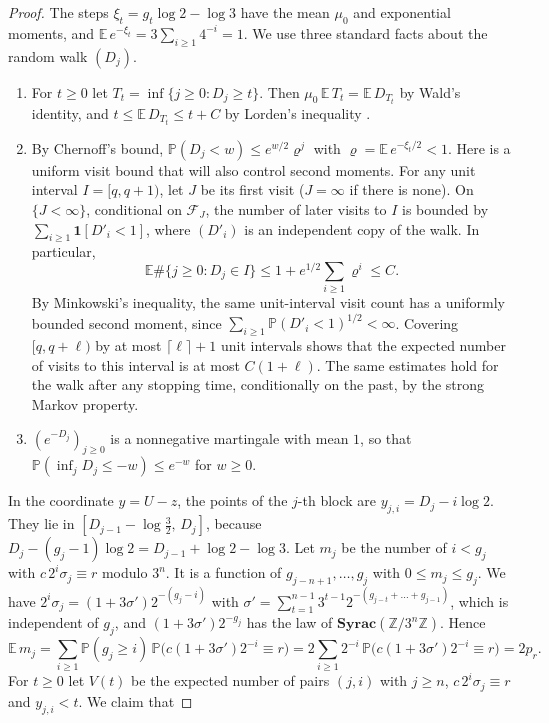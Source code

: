 \documentclass[12pt]{amsart}
\theoremstyle{definition}
\theoremstyle{remark}
\begin{document}
\begin{proof}
The steps $\xi_t=g_t\log2-\log3$ have the mean $\mu_0$ and exponential moments, and $\mathbb E\,e^{-\xi_t}=3\sum_{i\ge1}4^{-i}=1$. We use three standard facts about the random walk $(D_j)$.
\begin{enumerate}[label=(\roman*)]
	\item For $t\ge0$ let $T_t=\inf\{j\ge0:D_j\ge t\}$. Then $\mu_0\,\mathbb E\,T_t=\mathbb E\,D_{T_t}$ by Wald's identity, and $t\le\mathbb E\,D_{T_t}\le t+C$ by Lorden's inequality \cite{Lorden_1970}.
	\item By Chernoff's bound,
$\mathbb P(D_j<w)\le e^{w/2}\varrho^j$ with
$\varrho=\mathbb E\,e^{-\xi_t/2}<1$.
Here is a uniform visit bound that will also control second moments.
For any unit interval $I=[q,q+1)$, let $J$ be its first visit
($J=\infty$ if there is none). On $\{J<\infty\}$, conditional on
$\mathcal F_J$, the number of later visits to $I$ is bounded by
$\sum_{i\ge1}\mathbf 1[D'_i<1]$, where $(D'_i)$ is an independent
copy of the walk. In particular,
\[
\mathbb E\#\{j\ge0:D_j\in I\}
\le1+e^{1/2}\sum_{i\ge1}\varrho^i\le C.
\]
By Minkowski's inequality, the same unit-interval visit count
has a uniformly bounded second moment, since
$\sum_{i\ge1}\mathbb P(D'_i<1)^{1/2}<\infty$.
Covering $[q,q+\ell)$ by at most $\lceil\ell\rceil+1$ unit intervals
shows that the expected number of visits to this interval is at most
$C(1+\ell)$. The same estimates hold for the walk after any
stopping time, conditionally on the past, by the strong Markov property.
	\item $(e^{-D_j})_{j\ge0}$ is a nonnegative martingale with mean $1$, so that $\mathbb P(\inf_jD_j\le-w)\le e^{-w}$ for $w\ge0$.
\end{enumerate}
In the coordinate $y=U-z$, the points of the $j$-th block are $y_{j,i}=D_j-i\log2$. They lie in $[D_{j-1}-\log\tfrac32,\,D_j]$, because $D_j-(g_j-1)\log2=D_{j-1}+\log2-\log3$. Let $m_j$ be the number of $i<g_j$ with $c\,2^i\sigma_j\equiv r$ modulo $3^n$. It is a function of $g_{j-n+1},\ldots,g_j$ with $0\le m_j\le g_j$. We have $2^i\sigma_j=(1+3\sigma')2^{-(g_j-i)}$ with $\sigma'=\sum_{t=1}^{n-1}3^{t-1}2^{-(g_{j-t}+\dots+g_{j-1})}$, which is independent of $g_j$, and $(1+3\sigma')2^{-g_j}$ has the law of $\mathbf{Syrac}(\mathbb Z/3^n\mathbb Z)$. Hence
\[
\mathbb E\,m_j=\sum_{i\ge1}\mathbb P(g_j\ge i)\,\mathbb P\bigl(c(1+3\sigma')2^{-i}\equiv r\bigr)=2\sum_{i\ge1}2^{-i}\,\mathbb P\bigl(c(1+3\sigma')2^{-i}\equiv r\bigr)=2p_r .
\]
For $t\ge0$ let $V(t)$ be the expected number of pairs $(j,i)$ with $j\ge n$, $c\,2^i\sigma_j\equiv r$ and $y_{j,i}<t$. We claim that

\end{proof}
\end{document}
